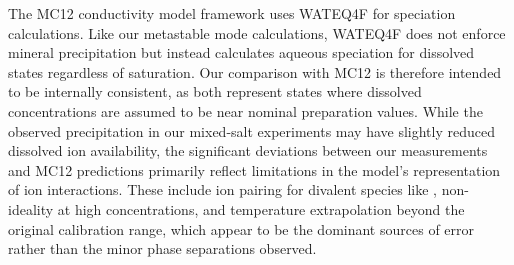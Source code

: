 \documentclass[journal=aesccq,manuscript=suppinfo]{achemso}
\begin{document}

The MC12 conductivity model framework uses WATEQ4F \citep{ball_users_1991, McCleskey2012} for speciation calculations. Like our metastable mode calculations, WATEQ4F does not enforce mineral precipitation but instead calculates aqueous speciation for dissolved states regardless of saturation. Our comparison with MC12 is therefore intended to be internally consistent, as both represent states where dissolved concentrations are assumed to be near nominal preparation values. While the observed precipitation in our mixed-salt experiments may have slightly reduced dissolved ion availability, the significant deviations between our measurements and MC12 predictions primarily reflect limitations in the model's representation of ion interactions. These include ion pairing for divalent species like , non-ideality at high concentrations, and temperature extrapolation beyond the original calibration range, which appear to be the dominant sources of error rather than the minor phase separations observed.


\end{document}
